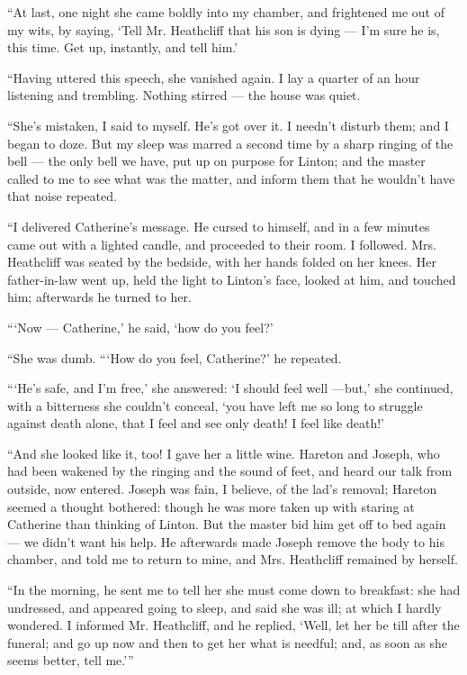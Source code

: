 \par “At last, one night she came boldly into my chamber, and frightened me out of my wits, by saying, ‘Tell Mr. Heathcliff that his son is dying — I'm sure he is, this time. Get up, instantly, and tell him.’
\par “Having uttered this speech, she vanished again. I lay a quarter of an hour listening and trembling. Nothing stirred — the house was quiet.
\par “She's mistaken, I said to myself. He's got over it. I needn't disturb them; and I began to doze. But my sleep was marred a second time by a sharp ringing of the bell — the only bell we have, put up on purpose for Linton; and the master called to me to see what was the matter, and inform them that he wouldn't have that noise repeated.
\par “I delivered Catherine's message. He cursed to himself, and in a few minutes came out with a lighted candle, and proceeded to their room. I followed. Mrs. Heathcliff was seated by the bedside, with her hands folded on her knees. Her father-in-law went up, held the light to Linton's face, looked at him, and touched him; afterwards he turned to her.
\par “‘Now — Catherine,’ he said, ‘how do you feel?’
\par “She was dumb. “‘How do you feel, Catherine?’ he repeated.
\par “‘He's safe, and I'm free,’ she answered: ‘I should feel well —but,’ she continued, with a bitterness she couldn't conceal, ‘you have left me so long to struggle against death alone, that I feel and see only death! I feel like death!’
\par “And she looked like it, too! I gave her a little wine. Hareton and Joseph, who had been wakened by the ringing and the sound of feet, and heard our talk from outside, now entered. Joseph was fain, I believe, of the lad's removal; Hareton seemed a thought bothered: though he was more taken up with staring at Catherine than thinking of Linton. But the master bid him get off to bed again — we didn't want his help. He afterwards made Joseph remove the body to his chamber, and told me to return to mine, and Mrs. Heathcliff remained by herself.
\par “In the morning, he sent me to tell her she must come down to breakfast: she had undressed, and appeared going to sleep, and said she was ill; at which I hardly wondered. I informed Mr. Heathcliff, and he replied, ‘Well, let her be till after the funeral; and go up now and then to get her what is needful; and, as soon as she seems better, tell me.’”
